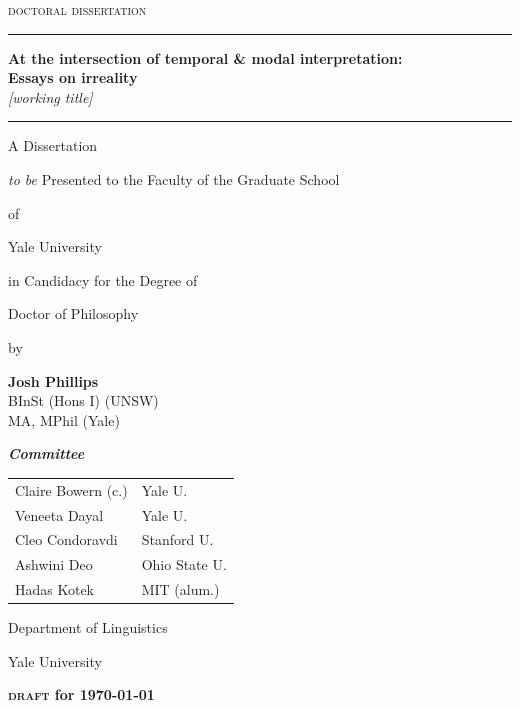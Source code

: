 \documentclass[12pt,dvipsnames]{report}
\date{}
\newcommand{\HRule}{\rule{\linewidth}{0.5mm}}
\begin{document}
	
\begin{center}
	\thispagestyle{empty}
	{\Large	\textsc{doctoral dissertation}}
	\vfill
	\HRule\vspace{.33cm}
	
	\setcounter{page}{-1}
	\textbf{{\huge At the intersection of temporal \& modal interpretation:}\\
		{\Large Essays on irreality}}\\\textit{[working title]}
	
	\HRule
	\vfill
	\normalsize	A Dissertation
	
	\textit{to be }Presented to the Faculty of the Graduate School
	
	of
	
	Yale University
	
	in Candidacy for the Degree of 
	
	Doctor of Philosophy
	\vfill
	{\small by
		
		\textbf{Josh Phillips}\\\footnotesize BInSt (Hons I\textasteriskcentered)  (UNSW)\\MA, MPhil (Yale)}
	\vfill
	\textit{\textbf{Committee}}\\
	\begin{tabular}{ll}
		Claire Bowern (c.) & Yale U.\\
		Veneeta Dayal & Yale U.\\
		Cleo Condoravdi & Stanford U.\\
		Ashwini Deo & Ohio State U.\\
		Hadas Kotek & MIT  (alum.)\\
	\end{tabular}
	
	
	
	\vfill
	\sc Department of Linguistics
	
	Yale University
	
	\textbf{\textsc{draft} for \today}
	
	
\end{center}\newpage


\end{document}

